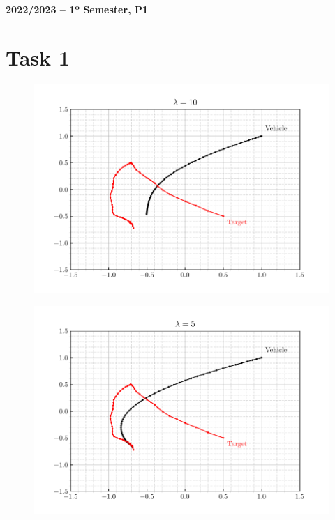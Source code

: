 \documentclass[12pt]{article}
\begin{document}
\begin{center}
    \large \bf 2022/2023 -- 1º Semester, P1
\end{center}

\thispagestyle{empty}

\setcounter{page}{0}

\newpage

\tableofcontents 

\newpage

\section{Task 1}

\begin{figure}[H]
    \centering
    \includegraphics{../../src/task_1/output/ex_1_i=1.pdf}
\end{figure}

\begin{figure}[H]
    \centering
    \includegraphics{../../src/task_1/output/ex_1_i=2.pdf}
\end{figure}
\end{document}
